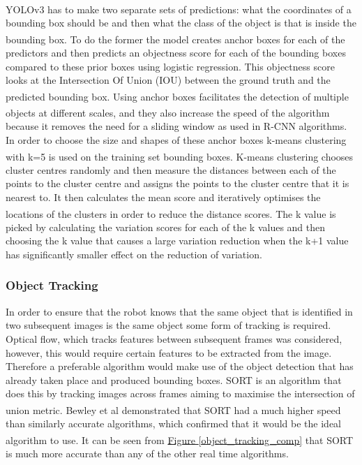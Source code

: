 \documentclass[11pt]{article}		%
\newcommand{\supercite}[1]{\textsuperscript{\cite{#1}}}		%
\newcommand{\figref}[1]{\hyperref[#1]{Figure \ref*{#1}}}    %
\begin{document}
	        \\
	        YOLOv3 has to make two separate sets of predictions: what the coordinates of a bounding box should be and then what the class of the object is that is inside the bounding box.\supercite{YOLOV3} To do the former the model creates anchor boxes for each of the predictors and then predicts an objectness score for each of the bounding boxes compared to these prior boxes using logistic regression. This objectness score looks at the Intersection Of Union (IOU) between the ground truth and the predicted bounding box.\supercite{YOLOV2}\supercite{YOLOV3} Using anchor boxes facilitates the detection of multiple objects at different scales,\supercite{Anchor_Boxes} and they also increase the speed of the algorithm because it removes the need for a sliding window as used in R-CNN algorithms. 
	        \\
	        In order to choose the size and shapes of these anchor boxes k-means clustering with k=5 is used on the training set bounding boxes.\supercite{YOLOV2} K-means clustering chooses cluster centres randomly and then measure the distances between each of the points to the cluster centre and assigns the points to the cluster centre that it is nearest to. It then calculates the mean score and iteratively optimises the locations of the clusters in order to reduce the distance scores.\supercite{k-means-clustering} The k value is picked by calculating the variation scores for each of the k values and then choosing the k value that causes a large variation reduction when the k+1 value has significantly smaller effect on the reduction of variation. 
	
	        
	        \subsubsection{Object Tracking}
	        
	        In order to ensure that the robot knows that the same object that is identified in two subsequent images is the same object some form of tracking is required. 
	        Optical flow, which tracks features between subsequent frames was considered, however, this would require certain features to be extracted from the image. 
	        Therefore a preferable algorithm would make use of the object detection that has already taken place and produced bounding boxes. 
	        SORT is an algorithm that does this by tracking images across frames aiming to maximise the intersection of union metric. 
	        Bewley et al \supercite{object_tracking} demonstrated that SORT had a much higher speed than similarly accurate algorithms, which confirmed that it would be the ideal algorithm to use.\supercite{object_tracking} It can be seen from \figref{object_tracking_comp} that SORT is much more accurate than any of the other real time algorithms.
	        
\end{document}
